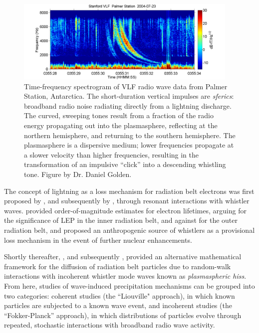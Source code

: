 \begin{figure}[t]
\begin{center}
\includegraphics[width=0.95\textwidth]{figures/Whistler_radio_palmer_2004-07-23_T035528.png}

\caption[An example of a lightning-generated whistler wave]{Time-frequency spectrogram of VLF radio wave data from Palmer Station, Antarctica. The short-duration vertical impulses are \emph{sferics}: broadband radio noise radiating directly from a lightning discharge. The curved, sweeping tones result from a fraction of the radio energy propagating out into the plasmasphere, reflecting at the northern hemisphere, and returning to the southern hemisphere. The plasmasphere is a dispersive medium; lower frequencies propagate at a slower velocity than higher frequencies, resulting in the transformation of an impulsive ``click'' into a descending whistling tone. Figure by Dr. Daniel Golden.\footnotemark[2] }
\label{fig:whistlers}
\end{center}
\end{figure}

The concept of lightning as a loss mechanism for radiation belt electrons was first proposed by \cite{Dungey1963}, and subsequently by \cite{Cornwall1964}, through resonant interactions with whistler waves. \citeauthor{Dungey1963} provided order-of-magnitude estimates for electron lifetimes, arguing for the significance of LEP in the inner radiation belt, and against for the outer radiation belt, and proposed an anthropogenic source of whistlers as a provisional loss mechanism in the event of further nuclear enhancements. 

Shortly thereafter, \cite{Kennel1966b}, and subsequently \cite{Lyons1973}, provided an alternative mathematical framework for the diffusion of radiation belt particles due to random-walk interactions with incoherent whistler mode waves known as \emph{plasmaspheric hiss}. From here, studies of wave-induced precipitation mechanisms can be grouped into two categories: coherent studies (the ``Liouville" approach), in which known particles are subjected to a known wave event, and incoherent studies (the ``Fokker-Planck'' approach), in which distributions of particles evolve through repeated, stochastic interactions with broadband radio wave activity.

